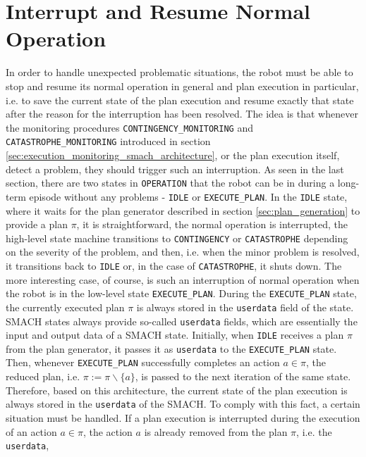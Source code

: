 \documentclass[english, master, utf8]{base/thesis_KBS}
\newcommand{\code}[1]{\colorbox{light-gray}{\texttt{#1}}}
\begin{document}
\section{Interrupt and Resume Normal Operation}

\cite{Cashmore:2015}
In order to handle unexpected problematic situations, the robot must be able to stop and resume its normal operation in general
and plan execution in particular, i.e. to save the current state of the plan execution and resume exactly that state after the reason
for the interruption has been resolved. The idea is that whenever the monitoring procedures \code{CONTINGENCY\_MONITORING} and \code{CATASTROPHE\_MONITORING} 
introduced in section \ref{sec:execution_monitoring_smach_architecture}, or the plan execution itself, detect a problem, they should trigger such an interruption.
As seen in the last section, there are two states in \code{OPERATION} that the robot can be in during a long-term episode without any problems
- \code{IDLE} or \code{EXECUTE\_PLAN}. In the \code{IDLE} state, where it waits for the plan generator described in section \ref{sec:plan_generation} to provide a plan $\pi$,
it is straightforward, the normal operation is interrupted, the high-level state machine transitions to \code{CONTINGENCY} or \code{CATASTROPHE} depending
on the severity of the problem, and then, i.e. when the minor problem is resolved, it transitions back to \code{IDLE} or, in the case of \code{CATASTROPHE},
it shuts down. The more interesting case, of course, is such an interruption of normal operation when the robot is in the low-level state \code{EXECUTE\_PLAN}.
During the \code{EXECUTE\_PLAN} state, the currently executed plan $\pi$ is always stored in the \code{userdata} field of the state.
SMACH states always provide so-called \code{userdata} fields, which are essentially the input and output data of a SMACH state.
Initially, when \code{IDLE} receives a plan $\pi$ from the plan generator, it passes it as \code{userdata} to the \code{EXECUTE\_PLAN} state. Then, whenever \code{EXECUTE\_PLAN}
successfully completes an action $a \in \pi$, the reduced plan, i.e. $\pi := \pi \backslash \{a\}$, is passed to the next iteration of the same state.
Therefore, based on this architecture, the current state of the plan execution is always stored in the \code{userdata} of the SMACH. To comply with this fact, a certain situation
must be handled. If a plan execution is interrupted during the execution of an action $a \in \pi$, the action $a$ is already removed from the plan $\pi$, i.e. the \code{userdata},
\end{document}
